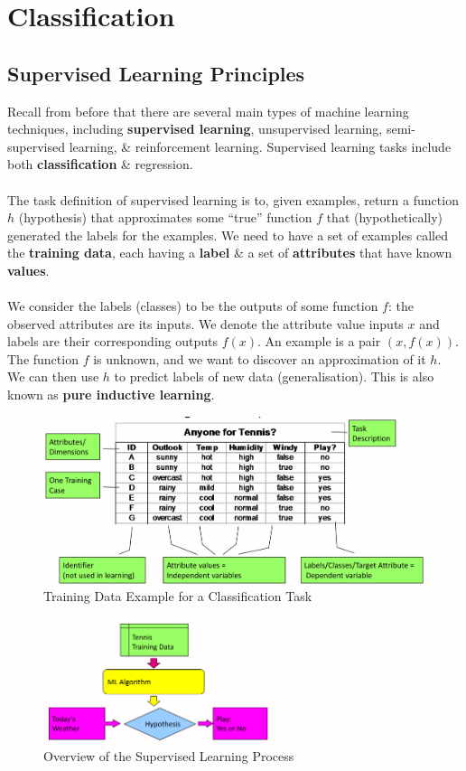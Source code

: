 \documentclass[a4paper,11pt]{article}
\begin{document}
\section{Classification}
\subsection{Supervised Learning Principles}
Recall from before that there are several main types of machine learning techniques, including \textbf{supervised
learning}, unsupervised learning, semi-supervised learning, \& reinforcement learning.
Supervised learning tasks include both \textbf{classification} \& regression.
\\\\
The task definition of supervised learning is to, given examples, return a function $h$ (hypothesis) that 
approximates some ``true'' function $f$ that (hypothetically) generated the labels for the examples.
We need to have a set of examples called the \textbf{training data}, each having a \textbf{label} \& a set of 
\textbf{attributes} that have known \textbf{values}.
\\\\
We consider the labels (classes) to be the outputs of some function $f$: the observed attributes are its inputs.
We denote the attribute value inputs $x$ and labels are their corresponding outputs $f(x)$.
An example is a pair $(x, f(x))$.
The function $f$ is unknown, and we want to discover an approximation of it $h$.
We can then use $h$ to predict labels of new data (generalisation).
This is also known as \textbf{pure inductive learning}.

\begin{figure}[H]
    \centering
    \includegraphics[width=\textwidth]{./images/classification_data_example.png}
    \caption{Training Data Example for a Classification Task}
\end{figure}

\begin{figure}[H]
    \centering
    \includegraphics[width=0.6\textwidth]{./images/supervised_learning_overview.png}
    \caption{Overview of the Supervised Learning Process}
\end{figure}
\end{document}

